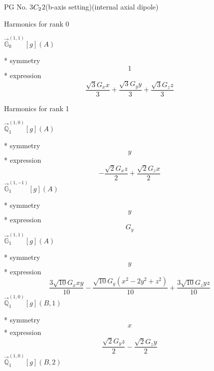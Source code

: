 \documentclass[fleqn,8pt]{jsarticle}
\begin{document}
\setcounter{MaxMatrixCols}{32}

\renewcommand{\tablename}{Table~}
\renewcommand{\figurename}{Figure~}
\begin{center}
\LARGE
PG No. 3\quad$C_{\rm 2}$\quad$2$\quad(b-axis setting)\quad[ monoclinic ] (internal axial dipole)
\end{center}

\noindent * Harmonics for rank 0

\noindent\quad $\vec{\mathbb{G}}_{0}^{(1,1)}[g](A)$

\noindent\quad ** symmetry
\begin{dmath*}
1
\end{dmath*}
\noindent\quad ** expression
\begin{dmath*}
\frac{\sqrt{3} G_{x} x}{3} + \frac{\sqrt{3} G_{y} y}{3} + \frac{\sqrt{3} G_{z} z}{3}
\end{dmath*}

\noindent * Harmonics for rank 1

\noindent\quad $\vec{\mathbb{Q}}_{1}^{(1,0)}[g](A)$

\noindent\quad ** symmetry
\begin{dmath*}
y
\end{dmath*}
\noindent\quad ** expression
\begin{dmath*}
- \frac{\sqrt{2} G_{x} z}{2} + \frac{\sqrt{2} G_{z} x}{2}
\end{dmath*}
\noindent\quad $\vec{\mathbb{G}}_{1}^{(1,-1)}[g](A)$

\noindent\quad ** symmetry
\begin{dmath*}
y
\end{dmath*}
\noindent\quad ** expression
\begin{dmath*}
G_{y}
\end{dmath*}
\noindent\quad $\vec{\mathbb{G}}_{1}^{(1,1)}[g](A)$

\noindent\quad ** symmetry
\begin{dmath*}
y
\end{dmath*}
\noindent\quad ** expression
\begin{dmath*}
\frac{3 \sqrt{10} G_{x} x y}{10} - \frac{\sqrt{10} G_{y} \left(x^{2} - 2 y^{2} + z^{2}\right)}{10} + \frac{3 \sqrt{10} G_{z} y z}{10}
\end{dmath*}
\noindent\quad $\vec{\mathbb{Q}}_{1}^{(1,0)}[g](B,1)$

\noindent\quad ** symmetry
\begin{dmath*}
x
\end{dmath*}
\noindent\quad ** expression
\begin{dmath*}
\frac{\sqrt{2} G_{y} z}{2} - \frac{\sqrt{2} G_{z} y}{2}
\end{dmath*}
\noindent\quad $\vec{\mathbb{Q}}_{1}^{(1,0)}[g](B,2)$
\end{document}
